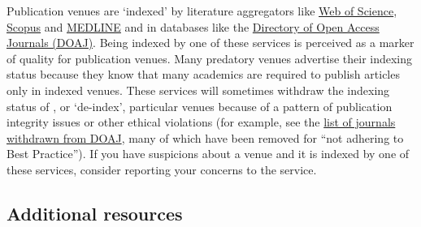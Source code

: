 \documentclass[letterpaper, 12pt]{article}
\begin{document}
Publication venues are `indexed' by literature aggregators like \href{https://www.webofscience.com/wos/}{Web of Science}, \href{https://www.scopus.com}{Scopus} and \href{https://www.nlm.nih.gov/medline/medline_home.html}{MEDLINE} and in databases like the \href{https://doaj.org/}{Directory of Open Access Journals (DOAJ)}. Being indexed by one of these services is perceived as a marker of quality for publication venues. Many predatory venues advertise their indexing status because they know that many academics are required to publish articles only in indexed venues. These services will sometimes withdraw the indexing status of , or `de-index', particular venues because of a pattern of publication integrity issues or other ethical violations (for example, see the \href{https://docs.google.com/spreadsheets/d/1Kv3MbgFSgtSDnEGkA2JacrSjunRu0umHeZCtcMeqO5E/edit?gid=2104690845\#gid=2104690845}{list of journals withdrawn from DOAJ}, many of which have been removed for ``not adhering to Best Practice''). If you have suspicions about a venue and it is indexed by one of these services, consider reporting your concerns to the service.

\subsection*{Additional resources}
\end{document}
